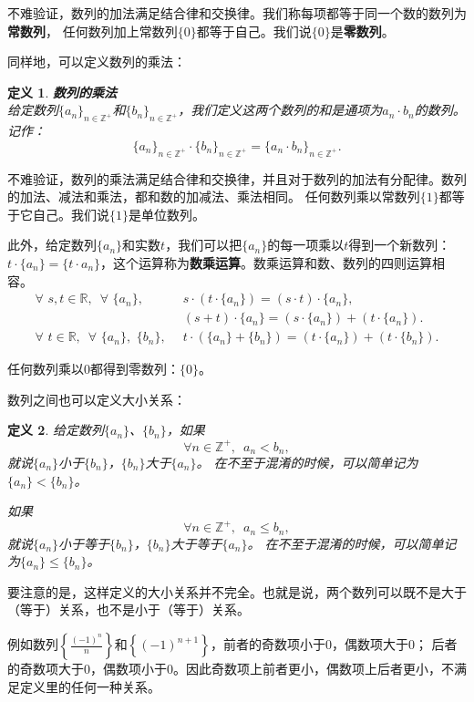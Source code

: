 \documentclass[12pt,UTF8]{ctexbook}
\newtheorem{df}{定义}[section]
\begin{document}
不难验证，数列的加法满足结合律和交换律。我们称每项都等于同一个数的数列为\textbf{常数列}，
任何数列加上常数列$\{0\}$都等于自己。我们说$\{0\}$是\textbf{零数列}。

同样地，可以定义数列的乘法：
\begin{df}\textbf{数列的乘法}\\
    给定数列$\{a_n\}_{n\in\mathbb{Z}^+}$和$\{b_n\}_{n\in\mathbb{Z}^+}$，我们定义这两个数列的和是通项为$a_n \cdot b_n$的数列。
    记作：
    $$ \{a_n\}_{n\in\mathbb{Z}^+} \cdot \{b_n\}_{n\in\mathbb{Z}^+} = \{a_n \cdot b_n\}_{n\in\mathbb{Z}^+}.$$    
\end{df}

不难验证，数列的乘法满足结合律和交换律，并且对于数列的加法有分配律。数列的加法、减法和乘法，都和数的加减法、乘法相同。
任何数列乘以常数列$\{1\}$都等于它自己。我们说$\{1\}$是单位数列。

此外，给定数列$\{a_n\}$和实数$t$，我们可以把$\{a_n\}$的每一项乘以$t$得到一个新数列：
$t\cdot \{a_n\} = \{t\cdot a_n\}$，这个运算称为\textbf{数乘运算}。数乘运算和数、数列的四则运算相容。
\begin{align*}
    \forall  \,\, s, t \in \mathbb{R}, \,\,\, \forall \,\, \{a_n\}, \,\,\,& s \cdot (t\cdot \{a_n\}) = (s\cdot t)\cdot \{a_n\},  \\
    & (s + t) \cdot \{a_n\} = (s\cdot \{a_n\}) + (t\cdot \{a_n\}).  \\
    \forall  \,\, t \in \mathbb{R}, \,\,\, \forall \,\, \{a_n\}, \,\, \{b_n\},\,\,\, & t \cdot (\{a_n\} + \{b_n\}) = (t \cdot \{a_n\}) + (t \cdot \{b_n\}).  
\end{align*}

任何数列乘以$0$都得到零数列：$\{0\}$。

数列之间也可以定义大小关系：
\begin{df}
    给定数列$\{a_n\}$、$\{b_n\}$，如果
    $$ \forall n\in \mathbb{Z}^+, \,\,\, a_n < b_n,$$
    就说$\{a_n\}$小于$\{b_n\}$，$\{b_n\}$大于$\{a_n\}$。
    在不至于混淆的时候，可以简单记为$\{a_n\} < \{b_n\}$。
    
    如果
    $$ \forall n\in \mathbb{Z}^+, \,\,\, a_n \leqslant b_n,$$
    就说$\{a_n\}$小于等于$\{b_n\}$，$\{b_n\}$大于等于$\{a_n\}$。
    在不至于混淆的时候，可以简单记为$\{a_n\} \leqslant \{b_n\}$。
\end{df}


要注意的是，这样定义的大小关系并不完全。也就是说，两个数列可以既不是大于（等于）关系，也不是小于（等于）关系。

例如数列$\left\{\frac{(-1)^n}{n}\right\}$和$\left\{(-1)^{n+1}\right\}$，前者的奇数项小于$0$，偶数项大于$0$；
后者的奇数项大于$0$，偶数项小于$0$。因此奇数项上前者更小，偶数项上后者更小，不满足定义里的任何一种关系。
\end{document}
